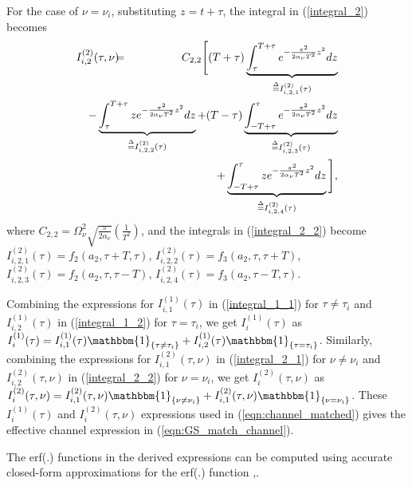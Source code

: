 For the case of $\nu=\nu_i$, substituting $z=t+\tau$, the integral in (\ref{integral_2}) becomes
\begin{eqnarray}
I_{i,2}^{(2)}(\tau,\nu) & \hspace{-2mm} = & \hspace{-2mm} C_{2,2}\Bigg[(T+\tau)\underbrace{\int_{\tau}^{T+\tau}e^{-\frac{\pi^{2}}{2\alpha_{\nu}T^{2}}z^{2}}dz}_{\overset{\Delta}{=}I_{i,2,1}^{(2)}(\tau)} \nonumber \\
& \hspace{-20mm} & \hspace{-15mm} -\underbrace{\int_{\tau}^{T+\tau}ze^{-\frac{\pi^{2}}{2\alpha_{\nu}T^{2}}z^{2}}dz}_{\overset{\Delta}{=}I_{i,2,2}^{(2)}(\tau)}+(T-\tau)\underbrace{\int_{-T+\tau}^{\tau}e^{-\frac{\pi^{2}}{2\alpha_{\nu}T^{2}}z^{2}}dz}_{\overset{\Delta}{=}I_{i,2,3}^{(2)}(\tau)} \nonumber \\
& \hspace{-20mm} & \hspace{-15mm}
+\underbrace{\int_{-T+\tau}^{\tau}ze^{-\frac{\pi^{2}}{2\alpha_{\nu}T^{2}}z^{2}}dz}_{\overset{\Delta}{=}I_{i,2,4}^{(2)}(\tau)}\Bigg], 
\label{integral_2_2}
\end{eqnarray}
where $C_{2,2}=\Omega_{\nu}^{2}\sqrt{\frac{\pi}{2\alpha_{\nu}}}\left(\frac{1}{T^{2}}\right)$, and the integrals in (\ref{integral_2_2}) 
become
$I_{i,2,1}^{(2)}(\tau)=f_2(a_2,\tau+T,\tau)$,
$I_{i,2,2}^{(2)}(\tau)=f_3(a_2,\tau,\tau+T)$,
$I_{i,2,3}^{(2)}(\tau)=f_2(a_2,\tau,\tau-T)$,
$I_{i,2,4}^{(2)}(\tau)=f_3(a_2,\tau-T,\tau)$. 

Combining the expressions for $I_{i,1}^{(1)}(\tau)$ in (\ref{integral_1_1}) for $\tau\neq \tau_i$ and $I_{i,2}^{(1)}(\tau)$ in (\ref{integral_1_2}) for $\tau=\tau_i$, we get $I_{i}^{(1)}(\tau)$ as
$I_{i}^{(1)}(\tau)=I_{i,1}^{(1)}(\tau)\mathbbm{1}_{\{\tau\neq\tau_i\}}+I_{i,2}^{(1)}(\tau)\mathbbm{1}_{\{\tau=\tau_i\}}$.
Similarly, combining the expressions for $I_{i,1}^{(2)}(\tau,\nu)$ in (\ref{integral_2_1}) for $\nu\neq \nu_i$ and $I_{i,2}^{(2)}(\tau,\nu)$ in (\ref{integral_2_2}) for $\nu=\nu_i$, 
we get $I_{i}^{(2)}(\tau, \nu)$ as
$I_{i}^{(2)}(\tau, \nu)=I_{i,1}^{(2)}(\tau,\nu)\mathbbm{1}_{\{\nu\neq\nu_i\}}+I_{i,1}^{(2)}(\tau,\nu)\mathbbm{1}_{\{\nu=\nu_i\}}$. These $I_{i}^{(1)}(\tau)$ and $I_{i}^{(2)}(\tau, \nu)$ expressions used in (\ref{eqn:channel_matched}) gives the effective channel expression in (\ref{eqn:GS_match_channel}).  

The erf(.) functions in the derived expressions can be computed using accurate closed-form approximations for the erf(.) function \cite{erf1},\cite{erf2}.

